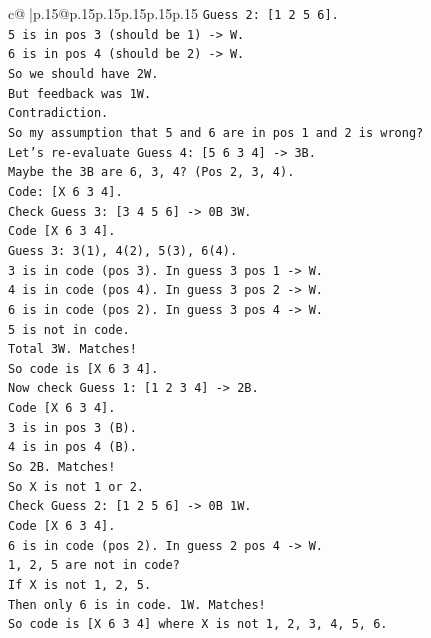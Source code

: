 \documentclass{article}
\begin{document}
{\begin{supertabular}{c@{$\;$}|p{.15\linewidth}@{}p{.15\linewidth}p{.15\linewidth}p{.15\linewidth}p{.15\linewidth}p{.15\linewidth}}
{{{\texttt{Guess 2: {[}1 2 5 6{]}.} \\
\texttt{5 is in pos 3 (should be 1) {-}> W.} \\
\texttt{6 is in pos 4 (should be 2) {-}> W.} \\
\texttt{So we should have 2W.} \\
\texttt{But feedback was 1W.} \\
\texttt{Contradiction.} \\
\texttt{So my assumption that 5 and 6 are in pos 1 and 2 is wrong?} \\
\texttt{Let's re{-}evaluate Guess 4: {[}5 6 3 4{]} {-}> 3B.} \\
\texttt{Maybe the 3B are 6, 3, 4? (Pos 2, 3, 4).} \\
\texttt{Code: {[}X 6 3 4{]}.} \\
\texttt{Check Guess 3: {[}3 4 5 6{]} {-}> 0B 3W.} \\
\texttt{Code {[}X 6 3 4{]}.} \\
\texttt{Guess 3: 3(1), 4(2), 5(3), 6(4).} \\
\texttt{3 is in code (pos 3). In guess 3 pos 1 {-}> W.} \\
\texttt{4 is in code (pos 4). In guess 3 pos 2 {-}> W.} \\
\texttt{6 is in code (pos 2). In guess 3 pos 4 {-}> W.} \\
\texttt{5 is not in code.} \\
\texttt{Total 3W. Matches!} \\
\texttt{So code is {[}X 6 3 4{]}.} \\
\texttt{Now check Guess 1: {[}1 2 3 4{]} {-}> 2B.} \\
\texttt{Code {[}X 6 3 4{]}.} \\
\texttt{3 is in pos 3 (B).} \\
\texttt{4 is in pos 4 (B).} \\
\texttt{So 2B. Matches!} \\
\texttt{So X is not 1 or 2.} \\
\texttt{Check Guess 2: {[}1 2 5 6{]} {-}> 0B 1W.} \\
\texttt{Code {[}X 6 3 4{]}.} \\
\texttt{6 is in code (pos 2). In guess 2 pos 4 {-}> W.} \\
\texttt{1, 2, 5 are not in code?} \\
\texttt{If X is not 1, 2, 5.} \\
\texttt{Then only 6 is in code. 1W. Matches!} \\
\texttt{So code is {[}X 6 3 4{]} where X is not 1, 2, 3, 4, 5, 6.} \\
}}}
\end{supertabular}}
\end{document}
